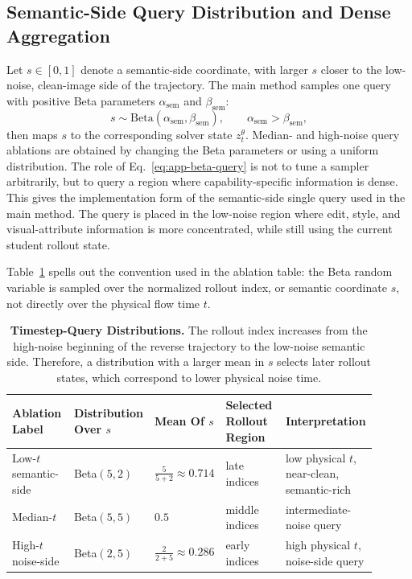 \vspace{0.2cm}


\subsection{Semantic-Side Query Distribution and Dense Aggregation}
\label{app:query-impl}

Let $s\in[0,1]$ denote a semantic-side coordinate, with larger $s$ closer to the low-noise, clean-image side of the trajectory. The main method samples one query with positive Beta parameters $\alpha_{\mathrm{sem}}$ and $\beta_{\mathrm{sem}}$:
\begin{equation}
  s\sim \mathrm{Beta}(\alpha_{\mathrm{sem}},\beta_{\mathrm{sem}}),
  \qquad \alpha_{\mathrm{sem}}>\beta_{\mathrm{sem}},
  \label{eq:app-beta-query}
\end{equation}
then maps $s$ to the corresponding solver state $z_t^\theta$. Median- and high-noise query ablations are obtained by changing the Beta parameters or using a uniform distribution. The role of Eq.~\eqref{eq:app-beta-query} is not to tune a sampler arbitrarily, but to query a region where capability-specific information is dense. This gives the implementation form of the semantic-side single query used in the main method. The query is placed in the low-noise region where edit, style, and visual-attribute information is more concentrated, while still using the current student rollout state. 

Table~\ref{tab:beta-query-map} spells out the convention used in the ablation table: the Beta random variable is sampled over the normalized rollout index, or semantic coordinate $s$, not directly over the physical flow time $t$.

\begin{table}[t]
  \centering
  \footnotesize
  \setlength{\tabcolsep}{3pt}
  \caption{\textbf{Timestep-Query Distributions.} The rollout index increases from the high-noise beginning of the reverse trajectory to the low-noise semantic side. Therefore, a distribution with a larger mean in $s$ selects later rollout states, which correspond to lower physical noise time.}
  \label{tab:beta-query-map}
  \vspace{-0.2cm}
  \begin{tabular}{@{}p{0.18\linewidth}p{0.19\linewidth}p{0.12\linewidth}p{0.18\linewidth}p{0.23\linewidth}@{}}
    \toprule
    \textbf{Ablation Label} & \textbf{Distribution Over $s$} & \textbf{Mean Of $s$} & \textbf{Selected Rollout Region} & \textbf{Interpretation}\\
    \midrule
    Low-$t$ semantic-side & Beta$(5,2)$ & $\frac{5}{5+2}\approx0.714$ & late indices & low physical $t$, near-clean, semantic-rich\\
    Median-$t$ & Beta$(5,5)$ & $0.5$ & middle indices & intermediate-noise query\\
    High-$t$ noise-side & Beta$(2,5)$ & $\frac{2}{2+5}\approx0.286$ & early indices & high physical $t$, noise-side query\\
    \bottomrule
  \end{tabular}
\end{table}

